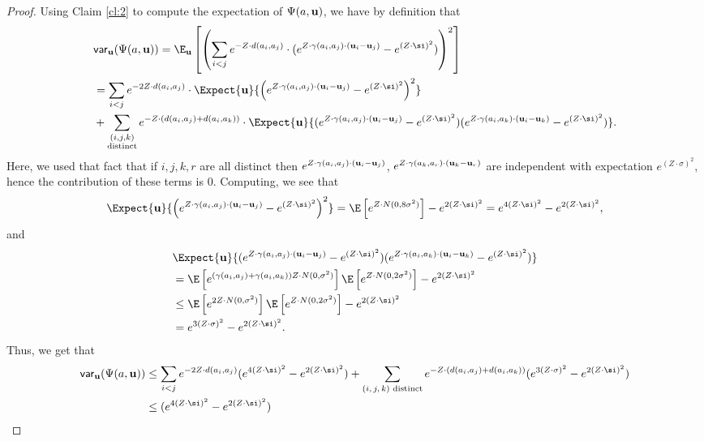 \begin{proof}
Using Claim \ref{cl:2} to compute the expectation of $\Psi(a,{\bf u})$, we have by definition that
\begin{align*}
&{\sf var}_{\bf u}  ( \Psi(a,{\bf u} ))
= \E_{\bf u}  \left[\left(\sum_{i<j} e^{-Z\cdot d(a_i,a_j)}\cdot (e^{Z\cdot\gamma(a_i,a_j)\cdot({\bf u} _i-{\bf u} _j)}-e^{(Z\cdot \si)^2}) \right)^2\right]\\
& =\sum_{i<j} e^{-2Z\cdot d(a_i,a_j)} \cdot\Expect{{\bf u}}{\left(e^{Z\cdot\gamma(a_i,a_j)\cdot({\bf u}_i-{\bf u}_j)}-e^{(Z\cdot \si)^2}\right)^2}\\
& + \sum_{\substack{(i,j,k) \\ \text{distinct}}}e^{-Z\cdot (d(a_i,a_j)+d(a_i,a_k))}\cdot
\Expect{{\bf u}}{(e^{Z\cdot\gamma(a_i,a_j)\cdot({\bf u}_i-{\bf u}_j)}-e^{(Z\cdot \si)^2})(e^{Z\cdot\gamma(a_i,a_k)\cdot({\bf u}_i-{\bf u}_k)}-e^{(Z\cdot \si)^2})}.
\end{align*}
Here, we used that fact that if $i,j,k,r$ are all distinct then $e^{Z\cdot\gamma(a_i,a_j)\cdot({\bf u}_i-{\bf u}_j)}$, $e^{Z\cdot\gamma(a_k,a_r)\cdot({\bf u}_k-{\bf u}_r)}$
are independent with expectation $e^{(Z\cdot \sigma)^2}$, hence the contribution of these terms is $0$. Computing, we see that
\[
\Expect{{\bf u}}{\left(e^{Z\cdot\gamma(a_i,a_j)\cdot({\bf u}_i-{\bf u}_j)}-e^{(Z\cdot \si)^2}\right)^2}
=\E\left[e^{Z\cdot N(0,8\sigma^2)}\right]-e^{2(Z\cdot \si)^2}
=e^{4(Z\cdot \si)^2}-e^{2(Z\cdot \si)^2},
\]
and
\begin{align*}
&\Expect{{\bf u}}{(e^{Z\cdot\gamma(a_i,a_j)\cdot({\bf u}_i-{\bf u}_j)}-e^{(Z\cdot \si)^2})
 (e^{Z\cdot\gamma(a_i,a_k)\cdot({\bf u}_i-{\bf u}_k)}-e^{(Z\cdot \si)^2})}\\
 &=
 \E\left[e^{(\gamma(a_i,a_j) + \gamma(a_i,a_k))Z\cdot N(0,\sigma^2)}\right]
 \E\left[e^{Z\cdot N(0,2\sigma^2)}\right]
 -e^{2(Z\cdot \si)^2}\\
 &\leq
 \E\left[e^{2Z\cdot N(0,\sigma^2)}\right]
 \E\left[e^{Z\cdot N(0,2\sigma^2)}\right]
 -e^{2(Z\cdot \si)^2}\\
 &= e^{3(Z\cdot \sigma)^2}-e^{2(Z\cdot \si)^2}.
\end{align*}
Thus, we get that
\begin{align*}
  {\sf var}_{\bf u} ( \Psi(a,{\bf u}))
  &\leq
 \sum_{i<j} e^{-2Z\cdot d(a_i,a_j)} (e^{4 (Z\cdot \si)^2}-e^{2 (Z\cdot \si)^2}) +
 \sum_{\text{$(i,j,k)$ distinct}} e^{-Z\cdot (d(a_i,a_j)+d(a_i,a_k))}(e^{3(Z\cdot \sigma)^2}-e^{2(Z\cdot \si)^2}) \\
 & \leq
 (e^{4 (Z\cdot \si)^2}-e^{2 (Z\cdot \si)^2})

\end{align*}
\end{proof}
